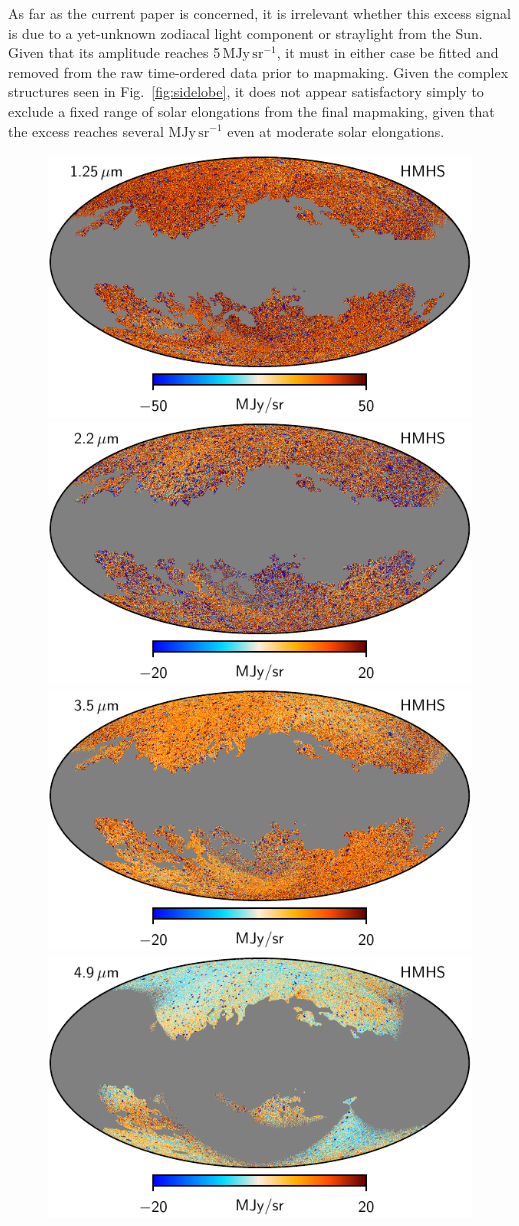 \documentclass{aa}
\begin{document}
As far as the current paper is concerned, it is irrelevant whether
this excess signal is due to a yet-unknown zodiacal light component or
straylight from the Sun. Given that its amplitude reaches 5\,$\mathrm{MJy\,sr^{-1}}$,
it must in either case be fitted and removed from the raw time-ordered
data prior to mapmaking. Given the complex structures seen in
Fig.~\ref{fig:sidelobe}, it does not appear satisfactory simply to exclude
a fixed range of solar elongations from the final mapmaking, given
that the excess reaches several $\mathrm{MJy\,sr^{-1}}$ even at moderate solar
elongations.

  \begin{figure}
  \centering
  \includegraphics[width=0.42\linewidth]{figs/dirbe_01_hmhs_v4.pdf}\hspace*{5mm}
  \includegraphics[width=0.42\linewidth]{figs/dirbe_02_hmhs_v4.pdf}\\
  \includegraphics[width=0.42\linewidth]{figs/dirbe_03_hmhs_v4.pdf}\hspace*{5mm}
  \includegraphics[width=0.42\linewidth]{figs/dirbe_04_hmhs_v4.pdf}\\

\end{figure}
\end{document}
